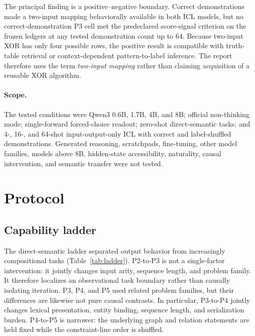 \documentclass[10pt,a4paper]{article}
\begin{document}
The principal finding is a positive--negative boundary. Correct demonstrations made a two-input mapping behaviorally available in both ICL models, but no correct-demonstration P3 cell met the predeclared score-signal criterion on the frozen ledgers at any tested demonstration count up to 64. Because two-input XOR has only four possible rows, the positive result is compatible with truth-table retrieval or context-dependent pattern-to-label inference. The report therefore uses the term \emph{two-input mapping} rather than claiming acquisition of a reusable XOR algorithm.

\paragraph{Scope.}
The tested conditions were Qwen3 0.6B, 1.7B, 4B, and 8B; official non-thinking mode; single-forward forced-choice readout; zero-shot direct-semantic tasks; and 4-, 16-, and 64-shot input-output-only ICL with correct and label-shuffled demonstrations. Generated reasoning, scratchpads, fine-tuning, other model families, models above 8B, hidden-state accessibility, naturality, causal intervention, and semantic transfer were not tested.

\section{Protocol}

\subsection{Capability ladder}

The direct-semantic ladder separated output behavior from increasingly compositional tasks (Table~\ref{tab:ladder}). P2-to-P3 is not a single-factor intervention: it jointly changes input arity, sequence length, and problem family. It therefore localizes an observational task boundary rather than causally isolating iteration. P3, P4, and P5 used related problem families, but their differences are likewise not pure causal contrasts. In particular, P3-to-P4 jointly changes lexical presentation, entity binding, sequence length, and serialization burden. P4-to-P5 is narrower: the underlying graph and relation statements are held fixed while the constraint-line order is shuffled.
\end{document}

